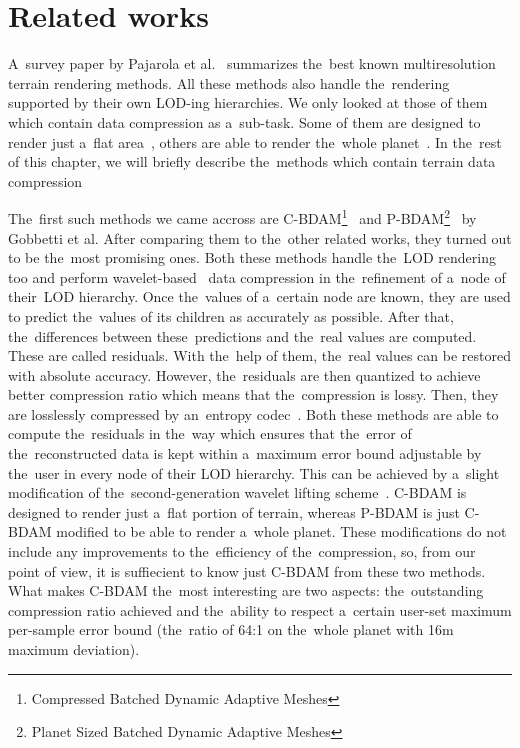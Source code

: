 \chapter{Related works}\label{chap:related_works}

 A~survey paper by Pajarola et al.~\cite{survey} summarizes the~best known multiresolution terrain rendering methods. All these methods also handle the~rendering supported by their own LOD-ing hierarchies. We only looked at those of them which contain data compression as a~sub-task. Some of them are designed to render just a~flat area~\cite{cbdam, jpeg2000terrain, meshesGPU1, meshesGPU2}, others are able to render the~whole planet~\cite{pbdam, meshes}. In the~rest of this chapter, we will briefly describe the~methods which contain terrain data compression
 
 The~first such methods we came accross are C-BDAM\footnote{Compressed Batched Dynamic Adaptive Meshes}~\cite{cbdam} and P-BDAM\footnote{Planet Sized Batched Dynamic Adaptive Meshes}~\cite{pbdam} by  Gobbetti et al. After comparing them to the~other related works, they turned out to be the~most promising ones. Both these methods handle the~LOD rendering too and perform wavelet-based~\cite{waveletsTutorial} data compression in the~refinement of a~node of their~LOD hierarchy. Once the~values of a~certain node are known, they are used to predict the~values of its children as accurately as possible. After that, the~differences between these~predictions and the~real values are computed. These are called residuals. With the~help of them, the~real values can be restored with absolute accuracy. However, the~residuals are then quantized to achieve better compression ratio which means that the~compression is lossy. Then, they are losslessly compressed by an~entropy codec~\cite{entropy1, entropy2}. Both these methods are able to compute the~residuals in the~way which ensures that the~error of the~reconstructed data is kept within a~maximum error bound adjustable by the~user in every node of their LOD hierarchy. This can be achieved by a~slight modification of the~second-generation wavelet lifting scheme~\cite{two-stage}. C-BDAM is designed to render just a~flat portion of terrain, whereas P-BDAM is just C-BDAM modified to be able to render a~whole planet. These modifications do not include any improvements to the~efficiency of the~compression, so, from our point of view, it is suffiecient to know just C-BDAM from these two methods. What makes C-BDAM the~most interesting are two aspects: the~outstanding compression ratio achieved and the~ability to respect a~certain user-set maximum per-sample error bound (the~ratio of 64:1 on the~whole planet with 16m maximum deviation).
 
